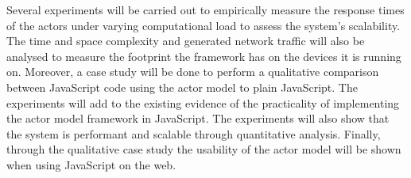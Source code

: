 \documentclass[12pt]{report}
\begin{document}
Several experiments will be carried out to empirically measure the response times of the actors under varying computational load to assess the system’s scalability. The time and space complexity and generated network traffic will also be analysed to measure the footprint the framework has on the devices it is running on. Moreover, a case study will be done to perform a qualitative comparison between JavaScript code using the actor model to plain JavaScript. The experiments will add to the existing evidence of the practicality of implementing the actor model framework in JavaScript. The experiments will also show that the system is performant and scalable through quantitative analysis. Finally, through the qualitative case study the usability of the actor model will be shown when using JavaScript on the web. 


\end{document}
